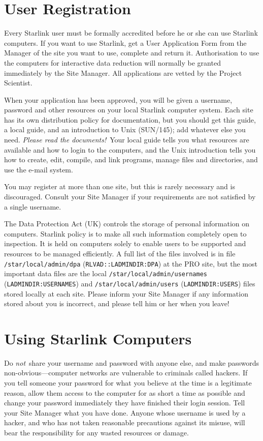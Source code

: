 \section{User Registration}

Every Starlink user must be formally accredited before he or she can use
Starlink computers.
If you want to use Starlink, get a User Application Form from the Manager of
the site you want to use, complete and return it.
Authorisation to use the computers for interactive data reduction will
normally be granted immediately by the Site Manager.
All applications are vetted by the Project Scientist.

When your application has been approved, you will be given a username, password
and other resources on your local Starlink computer system.
Each site has its own distribution policy for documentation, but you should get
this guide, a local guide, and an introduction to Unix (SUN/145); add whatever
else you need.
{\em Please read the documents!}\,
Your local guide tells you what resources are available and how to login to
the computers, and the Unix introduction tells you how to create, edit,
compile, and link programs, manage files and directories, and use the e-mail
system.

You may register at more than one site, but this is rarely necessary and
is discouraged.
Consult your Site Manager if your requirements are not satisfied by a single
username.

The Data Protection Act (UK) controls the storage of personal information on
computers.
Starlink policy is to make all such information completely open to inspection.
It is held on computers solely to enable users to be supported and resources
to be managed efficiently.
A full list of the files involved is in file {\tt /star/\-local/\-admin/\-dpa}
({\tt RLVAD::LADMINDIR:DPA}) at the PRO site, but the most important data files
are the local {\tt /star/\-local/\-admin/\-usernames} ({\tt LADMINDIR:USERNAMES}) and
{\tt /star/\-local/\-admin/\-users} ({\tt LADMINDIR:USERS}) files stored locally
at each site.
Please inform your Site Manager if any information stored about you is
incorrect, and please tell him or her when you leave!

\section{Using Starlink Computers}

Do {\em not}\, share your username and password with anyone else, and make
passwords non-obvious---computer networks are vulnerable to criminals called
hackers.
If you tell someone your password for what you believe at the time is a
legitimate reason, allow them access to the computer for as short a time as
possible and change your password immediately they have finished their login
session.
Tell your Site Manager what you have done.
Anyone whose username is used by a hacker, and who has not taken reasonable
precautions against its misuse, will bear the responsibility for any wasted
resources or damage.

